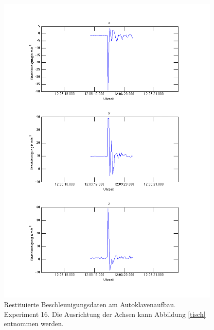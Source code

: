 \documentclass[12pt,a4paper]{scrartcl}
\begin{document}
\begin{figure}[H]
\centering
\includegraphics[scale=.5]{wakiki/tischmovement3.png}
\caption{Restituierte Beschleunigungsdaten am Autoklavenaufbau. Experiment 16. Die Ausrichtung der Achsen kann Abbildung \ref{tisch} entnommen werden. }
\label{tischmovement3}
\end{figure}
\end{document}
